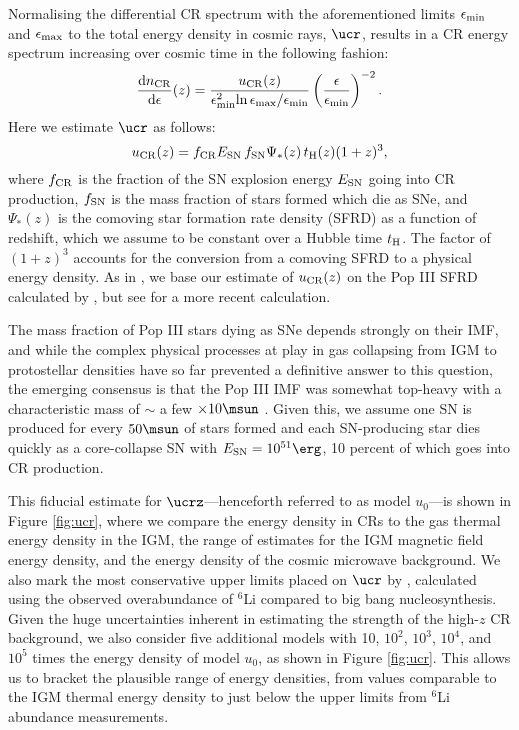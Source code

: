 Normalising the differential CR spectrum with the aforementioned limits $\epsilon_{\rm min}$ and $\epsilon_{\rm max}$ to the total energy density in cosmic rays, $\ucr$, results in a CR energy spectrum increasing over cosmic time in the following fashion:
 \begin{equation}
 \frac{{\rm d}n_{\rm \small CR}}{{\rm d}\epsilon}(z) = \frac{u_{\rm \small CR}(z)}{\epsilon_{\rm min}^2{\rm ln}\,\epsilon_{\rm max}{\large /}\epsilon_{\rm min}}  \left( \frac{\epsilon}{\epsilon_{\rm min}} \right)^{-2}.
 \end{equation}
Here we estimate $\ucr$ as follows:
\begin{equation}
u_{\rm \small CR}(z) = f_{\rm \small CR} E_{\rm \small SN}\, f_{\rm \small SN} \Psi_{*}(z)\, t_{\rm \small H}(z) (1+z)^3,
\end{equation}
where $f_{\rm \small CR}$ is the fraction of the SN explosion energy $E_{\rm \small SN}$ going into CR production, $f_{\rm \small SN}$ is the mass fraction of stars formed which die as SNe, and $\Psi_{*}(z)$ is the comoving star formation rate density (SFRD) as a function of redshift, which we assume to be constant over a Hubble time $t_{\rm \small H}$. The factor of $(1+z)^3$ accounts for the conversion from a comoving SFRD to a physical energy density. As in \citet{Hummeletal2015}, we base our estimate of $u_{\rm \small CR}(z)$ on the Pop III SFRD calculated by \citet{GreifBromm2006}, but see \citet{Campisietal2011} for a more recent calculation. 

The mass fraction of Pop III stars dying as SNe depends strongly on their IMF, and while the complex physical processes at play in gas collapsing from IGM to protostellar densities have so far prevented a definitive answer to this question, the emerging consensus is that the Pop III IMF was somewhat top-heavy with a characteristic mass of $\sim$ a few $\times 10\msun$ \citep{Bromm2013}.  Given this, we assume one SN is produced for every $50\msun$ of stars formed and each SN-producing star dies quickly as a core-collapse SN with $E_{\rm \small SN} = 10^{51}\erg$, 10 percent of which goes into CR production.  

This fiducial estimate for $\ucrz$---henceforth referred to as model $u_0$---is shown in Figure \ref{fig:ucr}, where we compare the energy density in CRs to the gas thermal energy density in the IGM, the range of estimates for the IGM magnetic field energy density, and the energy density of the cosmic microwave background. We also mark the most conservative upper limits placed on $\ucr$ by \citet{RollindeVangioniOlive2006}, calculated using the observed overabundance of $^6$Li compared to big bang nucleosynthesis. Given the huge uncertainties inherent in estimating the strength of the high-$z$ CR background, we also consider five additional models with 10, $10^2$, $10^3$, $10^4$, and $10^5$ times the energy density of model $u_0$, as shown in Figure \ref{fig:ucr}.  This allows us to bracket the plausible range of energy densities, from values comparable to the IGM thermal energy density to just below the upper limits from $^6$Li abundance measurements.
 